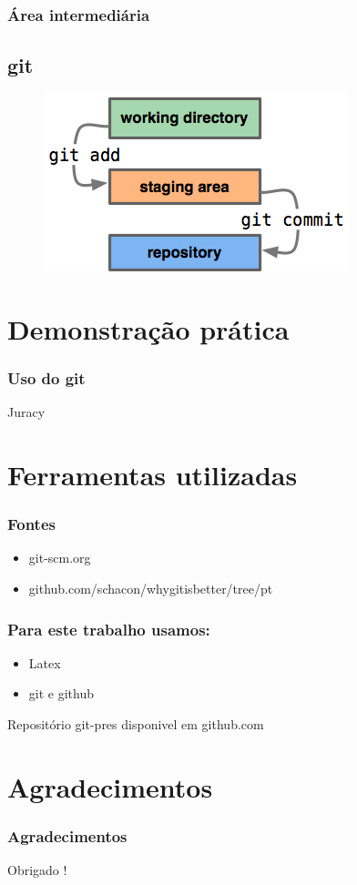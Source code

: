 \documentclass{beamer}
\begin{document}
  \begin{frame}
    \frametitle{Área intermediária}
    \subsection{git}
    \begin{figure}[htb]
     \begin{center}
    	\includegraphics[scale=1]{index1.png}
     \end{center}
    \end{figure}
    \vfill
  \end{frame}

  \section{Demonstração prática}
  \begin{frame}
    \frametitle{Uso do git}
    \vfill
      \begin{flushright}
        Juracy
    \end{flushright}
  \end{frame}

  \section{Ferramentas utilizadas}
  
  \begin{frame}
    \frametitle{Fontes}
    \begin{itemize}
      \item git-scm.org
      \item github.com/schacon/whygitisbetter/tree/pt
    \end{itemize}
  \end{frame}

  \begin{frame}
    \frametitle{Para este trabalho usamos:}
    \begin{itemize}
      \item Latex
      \item git e github
    \end{itemize}
    Repositório git-pres disponivel em github.com
  \end{frame}
  
  \section{Agradecimentos}
  \begin{frame}
    \frametitle{Agradecimentos}
    \begin{center}
       Obrigado !
    \end{center}
  \end{frame}
\end{document}
